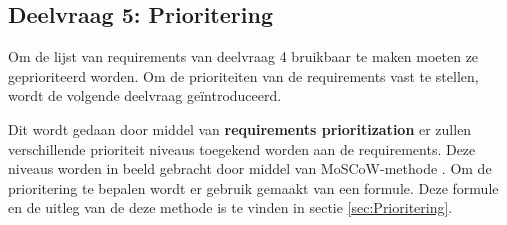 \subsection{Deelvraag 5: Prioritering}
Om de lijst van requirements van deelvraag 4 bruikbaar te maken moeten ze geprioriteerd worden.
Om de prioriteiten van de requirements vast te stellen, wordt de volgende deelvraag geïntroduceerd.

\begin{center}
	\textit{\SubquestionFive}
\end{center}

\whitespace[0.2]
Dit wordt gedaan door middel van \textbf{requirements prioritization} er zullen verschillende prioriteit niveaus toegekend worden aan de requirements.
Deze niveaus worden in beeld gebracht door middel van MoSCoW-methode \Parencite{MoSCoW}.
Om de prioritering te bepalen wordt er gebruik gemaakt van een formule.
Deze formule en de uitleg van de deze methode is te vinden in sectie \ref{sec:Prioritering}.

